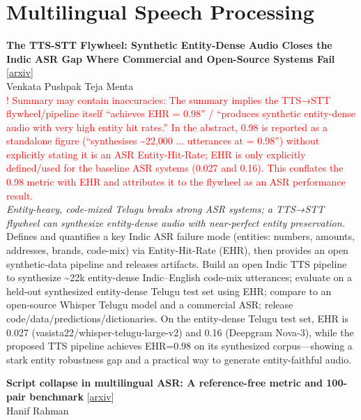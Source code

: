 \documentclass[12pt,letterpaper]{article}
\begin{document}
\medskip


\section*{Multilingual Speech Processing}

{\small\textbf{The TTS-STT Flywheel: Synthetic Entity-Dense Audio Closes the Indic ASR Gap Where Commercial and Open-Source Systems Fail}} {\scriptsize[\href{https://arxiv.org/abs/2605.03073}{arxiv}]}\\
{\scriptsize Venkata Pushpak Teja Menta}\\

{\scriptsize\textcolor{red}{! Summary may contain inaccuracies: The summary implies the TTS→STT flywheel/pipeline itself ``achieves EHR = 0.98'' / ``produces synthetic entity-dense audio with very high entity hit rates.'' In the abstract, 0.98 is reported as a standalone figure (``synthesises \textasciitilde{}22,000 ... utterances at = 0.98'') without explicitly stating it is an ASR Entity-Hit-Rate; EHR is only explicitly defined/used for the baseline ASR systems (0.027 and 0.16). This conflates the 0.98 metric with EHR and attributes it to the flywheel as an ASR performance result.}}\\[1pt]

{\small\textit{Entity-heavy, code-mixed Telugu breaks strong ASR systems; a TTS→STT flywheel can synthesize entity-dense audio with near-perfect entity preservation.}}\\[1pt]
{\footnotesize Defines and quantifies a key Indic ASR failure mode (entities: numbers, amounts, addresses, brands, code-mix) via Entity-Hit-Rate (EHR), then provides an open synthetic-data pipeline and releases artifacts. Build an open Indic TTS pipeline to synthesize \textasciitilde{}22k entity-dense Indic--English code-mix utterances; evaluate on a held-out synthesized entity-dense Telugu test set using EHR; compare to an open-source Whisper Telugu model and a commercial ASR; release code/data/predictions/dictionaries. On the entity-dense Telugu test set, EHR is 0.027 (vasista22/whisper-telugu-large-v2) and 0.16 (Deepgram Nova-3), while the proposed TTS pipeline achieves EHR=0.98 on its synthesized corpus---showing a stark entity robustness gap and a practical way to generate entity-faithful audio.}

\medskip

{\small\textbf{Script collapse in multilingual ASR: A reference-free metric and 100-pair benchmark}} {\scriptsize[\href{https://arxiv.org/abs/2604.08786}{arxiv}]}\\
{\scriptsize Hanif Rahman}\\
\end{document}
